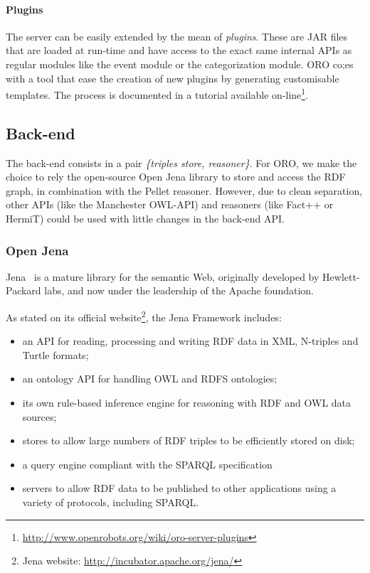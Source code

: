 \paragraph{Plugins} The server can be easily extended by the mean of
\emph{plugins}. These are JAR files that are loaded at run-time and have access
to the exact same internal APIs as regular modules like the event module or the
categorization module. ORO co;es with a tool that ease the creation of new
plugins by generating customisable templates. The process is documented in a
tutorial available
on-line\footnote{\url{http://www.openrobots.org/wiki/oro-server-plugins}}.

\subsection{Back-end}
\label{sect|backend}

The back-end consists in a pair \emph{\{triples store, reasoner\}}. For ORO,
we make the choice to rely the open-source {\sc Open Jena} library to store and
access the RDF graph, in combination with the {\sc Pellet} reasoner. However,
due to clean separation, other APIs (like the {\sc Manchester OWL-API}) and
reasoners (like {\sc Fact++} or {\sc HermiT}) could be used with little changes
in the back-end API.

\subsubsection{Open Jena}
\label{sect|jena}

{\sc Jena}~\cite{McBride2002} is a mature library for the semantic Web,
originally developed by Hewlett-Packard labs, and now under the leadership of
the Apache foundation.

As stated on its official website\footnote{{\sc Jena} website:
\url{http://incubator.apache.org/jena/}}, the Jena Framework includes:

\begin{itemize}
    \item an API for reading, processing and writing RDF data in XML, N-triples
    and Turtle formats;
    \item an ontology API for handling OWL and RDFS ontologies;
    \item its own rule-based inference engine for reasoning with RDF and OWL data
    sources;
    \item stores to allow large numbers of RDF triples to be efficiently stored
    on disk;
    \item a query engine compliant with the SPARQL specification
    \item servers to allow RDF data to be published to other applications using
    a variety of protocols, including SPARQL.
\end{itemize}

